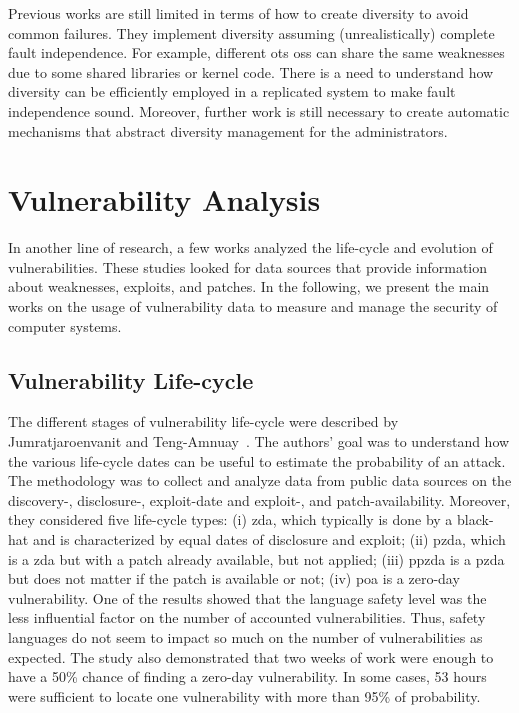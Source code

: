 Previous works are still limited in terms of how to create diversity to avoid common failures. 
They implement diversity assuming (unrealistically) complete fault independence. 
For example, different \gls{ots} \glspl{os} can share the same weaknesses due to some shared libraries or kernel code. 
There is a need to understand how diversity can be efficiently employed in a replicated system to make fault independence sound. 
Moreover, further work is still necessary to create automatic mechanisms that abstract diversity management for the administrators.



\section{Vulnerability Analysis}


In another line of research, a few works analyzed the life-cycle and evolution of vulnerabilities.
These studies looked for data sources that provide information about weaknesses, exploits, and patches.
In the following, we present the main works on the usage of vulnerability data to measure and manage the security of computer systems.

\subsection{Vulnerability Life-cycle}

The different stages of vulnerability life-cycle were described by Jumratjaroenvanit and Teng-Amnuay~\cite{Jumratjaroenvanit:2008}.
The authors' goal was to understand how the various life-cycle dates can be useful to estimate the probability of an attack. 
The methodology was to collect and analyze data from public data sources on the discovery-, disclosure-, exploit-date and exploit-, and patch-availability. 
Moreover, they considered five life-cycle types: (i) \gls{zda}, which typically is done by a black-hat and is characterized by equal dates of disclosure and exploit; (ii) \gls{pzda}, which is a \gls{zda} but with a patch already available, but not applied; 
(iii) \gls{ppzda} is a \gls{pzda} but does not matter if the patch is available or not; 
(iv) \gls{poa} is a zero-day vulnerability. 
One of the results showed that the language safety level was the less influential factor on the number of accounted vulnerabilities.
Thus, safety languages do not seem to impact so much on the number of vulnerabilities as expected.
The study also demonstrated that two weeks of work were enough to have a 50\% chance of finding a zero-day vulnerability. 
In some cases, 53 hours were sufficient to locate one vulnerability with more than 95\% of probability.


